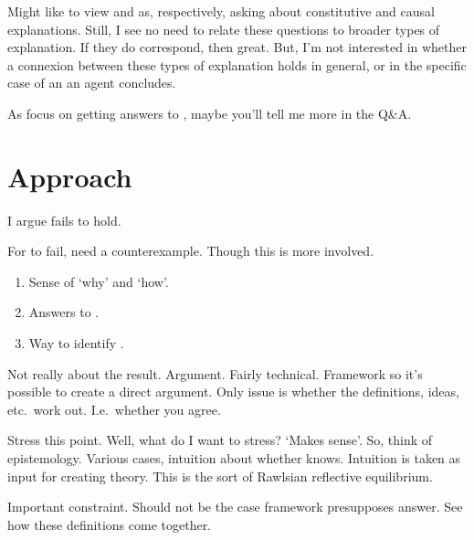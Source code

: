 \documentclass[10pt]{article}
\begin{document}
\begin{note}
  Might like to view \qWhy{} and \qHow{} as, respectively, asking about constitutive and causal explanations.
  Still, I see no need to relate these questions to broader types of explanation.
  If they do correspond, then great.
  But, I'm not interested in whether a connexion between these types of explanation holds in general, or in the specific case of an \eiw{} an agent concludes.

  As focus on getting answers to \qWhy{}, maybe you'll tell me more in the Q\&A.
\end{note}


\section{Approach}
\label{sec:approach}

\begin{note}
  I argue \issueInclusion{} fails to hold.
\end{note}


\begin{note}
  For \issueInclusion{} to fail, need a counterexample.
  Though this is more involved.

  \begin{enumerate}
  \item
    Sense of `why' and `how'.
  \item
    Answers to \qWhy{}.
  \item
    Way to identify \fingfr{}.
  \end{enumerate}
\end{note}

\begin{note}
  Not really about the result.
  Argument.
  Fairly technical.
  Framework so it's possible to create a direct argument.
  Only issue is whether the definitions, ideas, etc.\ work out.
  I.e.\ whether you agree.

  Stress this point.
  Well, what do I want to stress?
  `Makes sense'.
  So, think of epistemology.
  Various cases, intuition about whether knows.
  Intuition is taken as input for creating theory.
  This is the sort of Rawlsian reflective equilibrium.

  Important constraint.
  Should not be the case framework presupposes answer.
  See how these definitions come together.
  
\end{note}

\newpage
\end{document}
